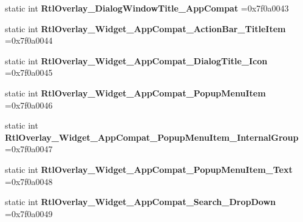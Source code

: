 \begin{DoxyCompactItemize}
static int {\bfseries Rtl\+Overlay\+\_\+\+Dialog\+Window\+Title\+\_\+\+App\+Compat} =0x7f0a0043
\item 
\mbox{\label{classandroid_1_1support_1_1v7_1_1appcompat_1_1R_1_1style_a2560f500f967c56a4a1357a776d808f3}} 
static int {\bfseries Rtl\+Overlay\+\_\+\+Widget\+\_\+\+App\+Compat\+\_\+\+Action\+Bar\+\_\+\+Title\+Item} =0x7f0a0044
\item 
\mbox{\label{classandroid_1_1support_1_1v7_1_1appcompat_1_1R_1_1style_adfdb6db3a943cee1f840fbee646953ce}} 
static int {\bfseries Rtl\+Overlay\+\_\+\+Widget\+\_\+\+App\+Compat\+\_\+\+Dialog\+Title\+\_\+\+Icon} =0x7f0a0045
\item 
\mbox{\label{classandroid_1_1support_1_1v7_1_1appcompat_1_1R_1_1style_ab23f3b311b0fd69474b5f5d3911192fe}} 
static int {\bfseries Rtl\+Overlay\+\_\+\+Widget\+\_\+\+App\+Compat\+\_\+\+Popup\+Menu\+Item} =0x7f0a0046
\item 
\mbox{\label{classandroid_1_1support_1_1v7_1_1appcompat_1_1R_1_1style_ad4be849c0a8331c8a02e2de7e33586a3}} 
static int {\bfseries Rtl\+Overlay\+\_\+\+Widget\+\_\+\+App\+Compat\+\_\+\+Popup\+Menu\+Item\+\_\+\+Internal\+Group} =0x7f0a0047
\item 
\mbox{\label{classandroid_1_1support_1_1v7_1_1appcompat_1_1R_1_1style_aab287a47240958b639985e0457f242a7}} 
static int {\bfseries Rtl\+Overlay\+\_\+\+Widget\+\_\+\+App\+Compat\+\_\+\+Popup\+Menu\+Item\+\_\+\+Text} =0x7f0a0048
\item 
\mbox{\label{classandroid_1_1support_1_1v7_1_1appcompat_1_1R_1_1style_a7161f186c51a7c268e5b0eb15919abc1}} 
static int {\bfseries Rtl\+Overlay\+\_\+\+Widget\+\_\+\+App\+Compat\+\_\+\+Search\+\_\+\+Drop\+Down} =0x7f0a0049
\item 
\mbox{\label{classandroid_1_1support_1_1v7_1_1appcompat_1_1R_1_1style_a456b962d788e40637a989595f5576775}} 

\end{DoxyCompactItemize}

